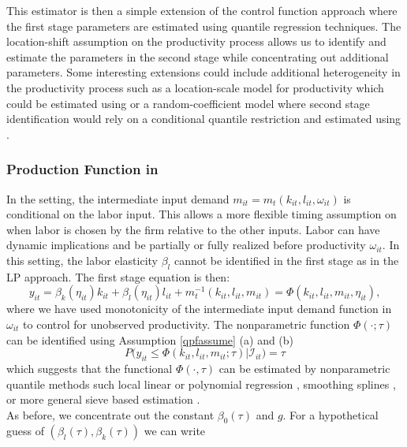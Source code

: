 \documentclass[11pt]{article}
\begin{document}
This estimator is then a simple extension of the control function approach where the first stage parameters are estimated using quantile regression techniques. The location-shift assumption on the productivity process allows us to identify and estimate the parameters in the second stage while concentrating out additional parameters. Some interesting extensions could include additional heterogeneity in the productivity process such as a location-scale model for productivity which could be estimated using \cite{He1997} or a random-coefficient model where second stage identification would rely on a conditional quantile restriction and estimated using \cite{Kaplan2016}.

\subsubsection{Production Function in \cite{Ackerberg2015}}
In the \cite{Ackerberg2015} setting, the intermediate input demand $m_{it}=m_{t}(k_{it}, l_{it}, \omega_{it})$ is conditional on the labor input. This allows a more flexible timing assumption on when labor is chosen by the firm relative to the other inputs. Labor can have dynamic implications and be partially or fully realized before productivity $\omega_{it}$. In this setting, the labor elasticity $\beta_{l}$ cannot be identified in the first stage as in the LP approach. The first stage equation is then:
\begin{equation}\label{acf1}
y_{it}=\beta_{k}(\eta_{it})k_{it}+\beta_{l}(\eta_{it})l_{it}+m_{t}^{-1}(k_{it}, l_{it}, m_{it})=\Phi(k_{it}, l_{it}, m_{it}, \eta_{it}),
\end{equation}
where we have used monotonicity of the intermediate input demand function in $\omega_{it}$ to control for unobserved productivity. The nonparametric function $\Phi(\cdot;\tau)$ can be identified using Assumption \eqref{qpfassume} (a) and (b)
\begin{equation} \label{acfqpf1}
P\big(y_{it}\leq \Phi(k_{it}, l_{it}, m_{it}; \tau)\big|\mathcal{I}_{it})=\tau
\end{equation}
which suggests that the functional $\Phi(\cdot, \tau)$ can be estimated by nonparametric quantile methods such local linear or polynomial regression \citep{Chaudhuri1991,Chaudhuri1991a}, smoothing splines \citep{KOENKER1994}, or more general sieve based estimation \citep{2012a}.\\
As before, we concentrate out the constant $\beta_{0}(\tau)$ and $g$. For a hypothetical guess of $(\beta_{l}(\tau), \beta_{k}(\tau))$ we can write
\end{document}
